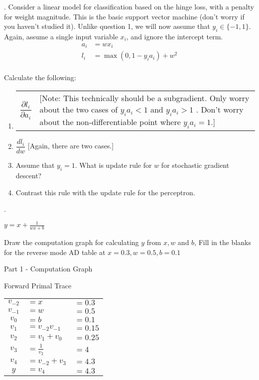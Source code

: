 \documentclass{article}
\begin{document}
. Consider a linear model for classification based on the hinge loss, with a penalty for weight magnitude. This is the basic support vector machine (don't worry if you haven't studied it). Unlike question 1, we will now assume that $y_i\in\{-1, 1\}$. Again, assume a single input variable $x_i$, and ignore the intercept term.
\begin{align*}
a_i &= wx_i \\
l_i &= \max (0, 1-y_i a_i) + w^2 \\
\end{align*}

Calculate the following: \\

{
\renewcommand{\theenumi}{\alph{enumi}}
\begin{enumerate}
\item \begin{tabular}{l l}$\dfrac{\partial l_i}{\partial a_i}$ & \makecell[l]{[Note: This technically should be a subgradient.  Only worry about the two cases of \\ $y_i a_i < 1$ and $y_i a_i > 1$ . Don't worry about the non-differentiable point where $y_ia_i = 1$.]}\end{tabular}
\item $\dfrac{dl_i}{dw}$ [Again, there are two cases.]
\item Assume that $y_i = 1$.  What is update rule for $w$ for stochastic gradient descent?
\item Contrast this rule with the update rule for the perceptron.
\end{enumerate}
}
. \begin{center}
$y = x + \frac{1}{wx + b}$
\end{center}
Draw the computation graph for calculating $y$ from $x, w$ and $b$, Fill in the blanks for the reverse mode AD table at $x=0.3,w = 0.5,b=0.1$
\begin{center}
Part 1 - Computation Graph
\end{center}
\vspace{150pt}
\begin{center}
Forward Primal Trace
\end{center}
\begin{center}
\begin{tabular}{ c l l }
$v_{-2}$ & $= x$ & $= 0.3$  \\
$v_{-1}$ & $= w$ & $= 0.5$  \\
$v_{0}$ & $= b$ & $= 0.1$ \\
\hline
$v_1$ & $= v_{-2} v_{-1}$ & $= 0.15$ \\ 
$v_2$ & $= v_1 + v_{0}$ & $= 0.25$ \\
$v_3$ & $= \frac{1}{v_2}$ & $= 4$ \\ 
$v_4$ & $= v_{-2} + v_3$ & $= 4.3$ \\ 
\hline
$y$ & $= v_4$ & $= 4.3$ \\
\end{tabular}
\end{center}
\end{document}
